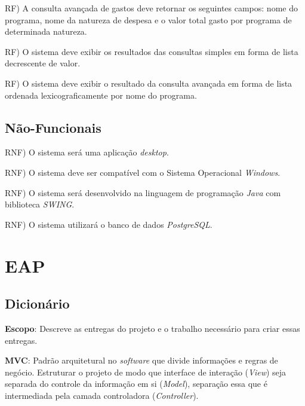 \documentclass[a4paper,12pt]{article}
\begin{document}
RF) A consulta avançada de gastos deve retornar os seguintes campos: nome do programa, nome da natureza de despesa e o valor total gasto por programa de determinada natureza. \\

\addtocounter{rf}{1}


RF) O sistema deve exibir os resultados das consultas simples em forma de lista decrescente de valor.\\

\addtocounter{rf}{1}

RF) O sistema deve exibir o resultado da consulta avançada em forma de lista ordenada lexicograficamente por nome do programa.\\


\subsection{Não-Funcionais}

\addtocounter{rnf}{1}


RNF) O sistema será uma aplicação \textit{desktop}.\\

\addtocounter{rnf}{1}

RNF) O sistema deve ser compatível com o Sistema Operacional \textit{Windows}.\\

\addtocounter{rnf}{1}

RNF) O sistema será desenvolvido na linguagem de programação \textit{Java} com biblioteca \textit{SWING}.\\

\addtocounter{rnf}{1}

RNF) O sistema utilizará o banco de dados \textit{PostgreSQL}.\\

\newpage
\section{EAP}

\subsection{Dicionário}

{\bf Escopo}: Descreve as entregas do projeto e o trabalho
necessário para criar essas entregas.

{\bf MVC}: Padrão arquitetural no \textit{software} que divide informações e regras de negócio. Estruturar o projeto de modo que interface de interação (\textit{View}) seja separada do controle da informação em si (\textit{Model}), separação essa que é intermediada pela camada controladora (\textit{Controller}).
\end{document}

